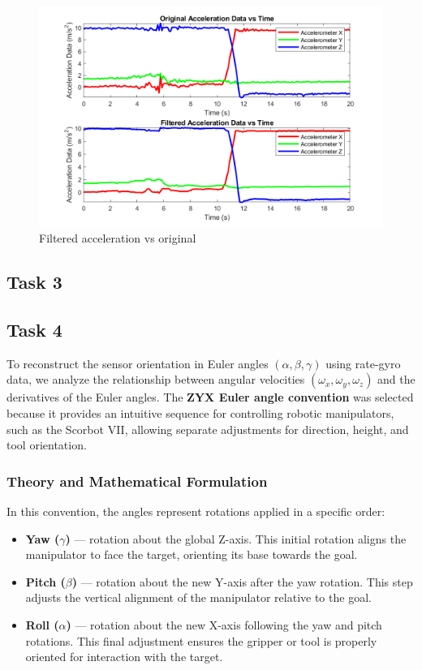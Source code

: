\documentclass[12pt]{article}
\begin{document}
\begin{figure}[H]
    \centerline{\includegraphics[scale=0.7]{Imagens/filteredaccelerationvsoriginal.png}}
    \caption{Filtered acceleration vs original}
    \label{fig}
\end{figure}

\subsection{Task 3}


\subsection{Task 4}

To reconstruct the sensor orientation in Euler angles \((\alpha, \beta, \gamma)\) using rate-gyro data, we analyze the relationship between angular velocities \((\omega_x, \omega_y, \omega_z)\) and the derivatives of the Euler angles. The \textbf{ZYX Euler angle convention} was selected because it provides an intuitive sequence for controlling robotic manipulators, such as the Scorbot VII, allowing separate adjustments for direction, height, and tool orientation.

\subsubsection{Theory and Mathematical Formulation}

In this convention, the angles represent rotations applied in a specific order:
\begin{itemize}
    \item \textbf{Yaw (\(\gamma\))} — rotation about the global Z-axis. This initial rotation aligns the manipulator to face the target, orienting its base towards the goal.
    \item \textbf{Pitch (\(\beta\))} — rotation about the new Y-axis after the yaw rotation. This step adjusts the vertical alignment of the manipulator relative to the goal.
    \item \textbf{Roll (\(\alpha\))} — rotation about the new X-axis following the yaw and pitch rotations. This final adjustment ensures the gripper or tool is properly oriented for interaction with the target.
\end{itemize}
\end{document}
